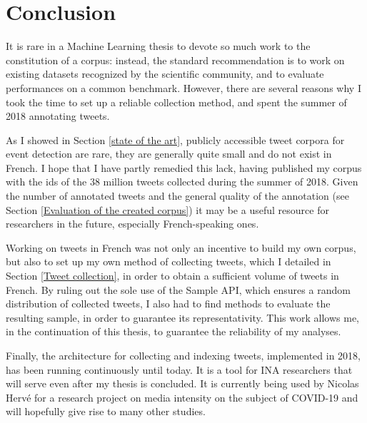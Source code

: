 \section{Conclusion}

It is rare in a Machine Learning thesis to devote so much work to the constitution of a corpus: instead, the standard recommendation is to work on existing datasets recognized by the scientific community, and to evaluate  performances on a common benchmark. However, there are several reasons why I took the time to set up a reliable collection method, and spent the summer of 2018 annotating tweets. 

As I showed in Section \ref{state of the art}, publicly accessible tweet corpora for event detection are rare, they are generally quite small and do not exist in French. I hope that I have partly remedied this lack, having published my corpus with the ids of the 38 million tweets collected during the summer of 2018. Given the number of annotated tweets and the general quality of the annotation (see Section \ref{Evaluation of the created corpus}) it may be a useful resource for researchers in the future, especially French-speaking ones.


Working on tweets in French was not only an incentive to build my own corpus, but also to set up my own method of collecting tweets, which I detailed in Section \ref{Tweet collection}, in order to obtain a sufficient volume of tweets in French. By ruling out the sole use of the Sample API, which ensures a random distribution of collected tweets, I also had to find methods to evaluate the resulting sample, in order to guarantee its representativity. This work allows me, in the continuation of this thesis, to guarantee the reliability of my analyses.


Finally, the architecture for collecting and indexing tweets, implemented in 2018, has been running continuously until today. It is a tool for INA researchers that will serve even after my thesis is concluded. It is currently being used by Nicolas Hervé for a research project on media intensity on the subject of COVID-19  and will hopefully give rise to many other studies.